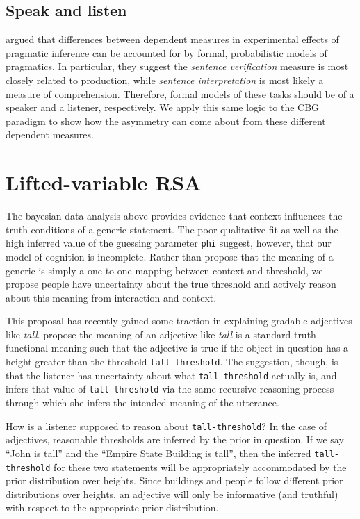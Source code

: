 \documentclass[10pt,letterpaper]{article}
\begin{document}
\subsection{Speak and listen}

 argued that differences between dependent measures in experimental effects of pragmatic inference can be accounted for by formal, probabilistic models of pragmatics. In particular, they suggest the \emph{sentence verification} measure is most closely related to production, while \emph{sentence interpretation} is most likely a measure of comprehension. Therefore, formal models of these tasks should be of a speaker and a listener, respectively. We apply this same logic to the CBG paradigm to show how the asymmetry can come about from these different dependent measures.

\section{Lifted-variable RSA}

The bayesian data analysis above provides evidence that context influences the truth-conditions of a generic statement. The poor qualitative fit as well as the high inferred value of the guessing parameter \lstinline{phi} suggest, however, that our model of cognition is incomplete. Rather than propose that the meaning of a generic is simply a one-to-one mapping between context and threshold, we propose people have uncertainty about the true threshold and actively reason about this meaning from interaction and context. 

This proposal has recently gained some traction in explaining gradable adjectives like \emph{tall}.   propose the meaning of an adjective like \emph{tall} is a standard truth-functional meaning such that the adjective is true if the object in question has a height greater than the threshold \lstinline{tall-threshold}. The suggestion, though, is that the listener has uncertainty about what \lstinline{tall-threshold} actually is, and infers that value of \lstinline{tall-threshold} via the same recursive reasoning process through which she infers the intended meaning of the utterance.

How is a listener supposed to reason about \lstinline{tall-threshold}? In the case of adjectives, reasonable thresholds are inferred by the prior in question. If we say ``John is tall'' and the ``Empire State Building is tall'', then the inferred \lstinline{tall-threshold} for these two statements will be appropriately accommodated by the prior distribution over heights. Since buildings and people follow different prior distributions over heights, an adjective will only be informative (and truthful) with respect to the appropriate prior distribution. 
\end{document}
